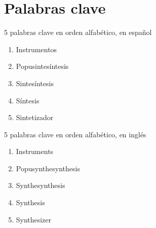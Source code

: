 \documentclass[../proyecto.tex]{subfiles}
\begin{document}
\section{Palabras clave}

5 palabras clave en orden alfabético, en español

\begin{enumerate}
    \item Instrumentos
    \item Popusintesíntesis
    \item Sintesíntesis
    \item Síntesis
    \item Sintetizador
\end{enumerate}

5 palabras clave en orden alfabético, en inglés

\begin{enumerate}
    \item Instruments
    \item Popusynthesynthesis
    \item Synthesynthesis
    \item Synthesis
    \item Synthesizer
\end{enumerate}
\end{document}
